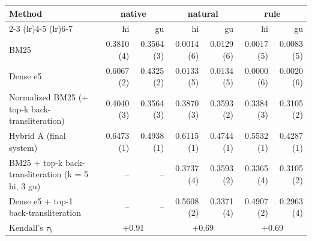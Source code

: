 \begin{tabular}{lrrrrrr}
\toprule
Method & \multicolumn{2}{c}{native} & \multicolumn{2}{c}{natural} & \multicolumn{2}{c}{rule} \\
\cmidrule(lr){2-3} \cmidrule(lr){4-5} \cmidrule(lr){6-7}
 & hi & gu & hi & gu & hi & gu \\
\midrule
BM25 & 0.3810 (4) & 0.3564 (3) & 0.0014 (6) & 0.0129 (6) & 0.0017 (5) & 0.0083 (5) \\
Dense e5 & 0.6067 (2) & 0.4325 (2) & 0.0133 (5) & 0.0134 (5) & 0.0000 (6) & 0.0020 (6) \\
Normalized BM25 (+ top-k back-transliteration) & 0.4040 (3) & 0.3564 (3) & 0.3870 (3) & 0.3593 (2) & 0.3384 (3) & 0.3105 (2) \\
Hybrid A (final system) & 0.6473 (1) & 0.4938 (1) & 0.6115 (1) & 0.4744 (1) & 0.5532 (1) & 0.4287 (1) \\
BM25 + top-k back-transliteration (k = 5 hi, 3 gu) & -- & -- & 0.3737 (4) & 0.3593 (2) & 0.3365 (4) & 0.3105 (2) \\
Dense e5 + top-1 back-transliteration & -- & -- & 0.5608 (2) & 0.3371 (4) & 0.4907 (2) & 0.2963 (4) \\
\midrule
Kendall's $\tau_b$ & \multicolumn{2}{c}{+0.91} & \multicolumn{2}{c}{+0.69} & \multicolumn{2}{c}{+0.69} \\
\bottomrule
\end{tabular}
